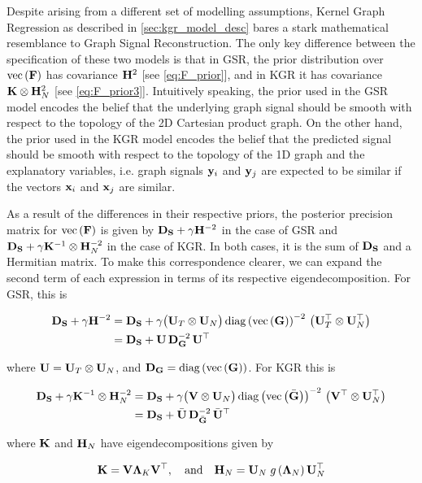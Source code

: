 \label{sec:KGR_and_GSR}

Despite arising from a different set of modelling assumptions, Kernel Graph Regression as described in \cref{sec:kgr_model_desc} bares a stark mathematical resemblance to Graph Signal Reconstruction. The only key difference between the specification of these two models is that in GSR, the prior distribution over $\text{\textup{vec}}\left(\mathbf{F}\right)$ has covariance $\mathbf{H}^2$ [see \cref{eq:F_prior}], and in KGR it has covariance $\mathbf{K} \otimes \mathbf{H}_N^2$ [see \cref{eq:F_prior3}]. Intuitively speaking, the prior used in the GSR model encodes the belief that the underlying graph signal should be smooth with respect to the topology of the 2D Cartesian product graph. On the other hand, the prior used in the KGR model encodes the belief that the predicted signal should be smooth with respect to the topology of the 1D graph and the explanatory variables, i.e. graph signals $\mathbf{y}_i$ and $\mathbf{y}_j$ are expected to be similar if the vectors $\mathbf{x}_i$ and $\mathbf{x}_j$ are similar. 


As a result of the differences in their respective priors, the posterior precision matrix for $\text{\textup{vec}}\left(\mathbf{F}\right)$ is given by $\mathbf{D}_{\mathbf{S}} + \gamma \mathbf{H}^{-2}$ in the case of GSR and $\mathbf{D}_{\mathbf{S}} + \gamma \mathbf{K}^{-1} \otimes \mathbf{H}_N^{-2}$ in the case of KGR. In both cases, it is the sum of $\mathbf{D}_{\mathbf{S}}$ and a Hermitian matrix. To make this correspondence clearer, we can expand the second term of each expression in terms of its respective eigendecomposition. For GSR, this is

\begin{align*}
    \mathbf{D}_{\mathbf{S}} + \gamma \mathbf{H}^{-2} &= \mathbf{D}_{\mathbf{S}} + \gamma \big(\mathbf{U}_T \otimes \mathbf{U}_N \big) \, \text{\textup{diag}}\left(\text{\textup{vec}}\left(\mathbf{G}\right)\right)^{-2} \, \big(\mathbf{U}_T^\top \otimes \mathbf{U}_N^\top \big) \\
    &= \mathbf{D}_{\mathbf{S}} + \mathbf{U} \, \mathbf{D}_{\mathbf{G}}^{-2} \, \mathbf{U}^\top
\end{align*}

where $\mathbf{U} = \mathbf{U}_T \otimes \mathbf{U}_N $, and $\mathbf{D}_{\mathbf{G}} = \text{\textup{diag}}\left(\text{\textup{vec}}\left(\mathbf{G}\right)\right)$. For KGR this is

\begin{align*}
    \mathbf{D}_{\mathbf{S}} + \gamma \mathbf{K}^{-1} \otimes \mathbf{H}_N^{-2} &= \mathbf{D}_{\mathbf{S}} + \gamma \big(\mathbf{V} \otimes \mathbf{U}_N \big) \, \text{\textup{diag}}\left(\text{\textup{vec}}\left(\bar{\mathbf{G}}\right)\right)^{-2} \, \big(\mathbf{V}^\top \otimes \mathbf{U}_N^\top \big) \\
    &= \mathbf{D}_{\mathbf{S}} + \bar{\mathbf{U}} \, \mathbf{D}_{\bar{\mathbf{G}}}^{-2} \, \bar{\mathbf{U}}^\top
\end{align*}

where $\mathbf{K}$ and $\mathbf{H}_N$ have eigendecompositions given by 

\begin{equation}
    \mathbf{K} = \mathbf{V} \mathbf{\Lambda}_K \mathbf{V}^\top, \quad \text{and} \quad \mathbf{H}_N = \mathbf{U}_N \; g\left(\mathbf{\Lambda}_N\right)  \mathbf{U}_N^\top
\end{equation}

